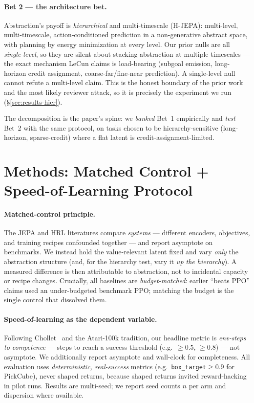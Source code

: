 \documentclass{article}
\begin{document}
\paragraph{Bet 2 --- the architecture bet.}
Abstraction's payoff is \emph{hierarchical} and multi-timescale (H-JEPA):
multi-level, multi-timescale, action-conditioned prediction in a non-generative
abstract space, with planning by energy minimization at every level. Our prior
nulls are all \emph{single-level}, so they are silent about stacking abstraction
at multiple timescales --- the exact mechanism LeCun claims is load-bearing
(subgoal emission, long-horizon credit assignment, coarse-far/fine-near
prediction). A single-level null cannot refute a multi-level claim. This is the
honest boundary of the prior work and the most likely reviewer attack, so it is
precisely the experiment we run (\S\ref{sec:results-hier}).

The decomposition is the paper's spine: we \emph{banked} Bet~1 empirically and
\emph{test} Bet~2 with the same protocol, on tasks chosen to be
hierarchy-sensitive (long-horizon, sparse-credit) where a flat latent is
credit-assignment-limited.

\section{Methods: Matched Control + Speed-of-Learning Protocol}
\label{sec:methods}

\paragraph{Matched-control principle.}
The JEPA and HRL literatures compare \emph{systems} --- different encoders,
objectives, and training recipes confounded together --- and report asymptote on
benchmarks. We instead hold the value-relevant latent fixed and vary \emph{only}
the abstraction structure (and, for the hierarchy test, vary it \emph{up the
hierarchy}). A measured difference is then attributable to abstraction, not to
incidental capacity or recipe changes. Crucially, all baselines are
\emph{budget-matched}: earlier ``beats PPO'' claims used an under-budgeted
benchmark PPO; matching the budget is the single control that dissolved them.

\paragraph{Speed-of-learning as the dependent variable.}
Following Chollet~\citep{chollet2019measure} and the Atari-100k tradition, our
headline metric is \emph{env-steps to competence} --- steps to reach a success
threshold (e.g.\ $\geq 0.5$, $\geq 0.8$) --- not asymptote. We additionally
report asymptote and wall-clock for completeness. All evaluation uses
\emph{deterministic, real-success} metrics (e.g.\ \texttt{box\_target}$\geq 0.9$
for PickCube), never shaped returns, because shaped returns invited
reward-hacking in pilot runs. Results are multi-seed; we report seed counts $n$
per arm and dispersion where available.
\end{document}

